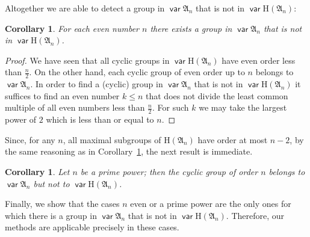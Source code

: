 \documentclass[preprint,1p,times]{elsarticle}
\DeclareMathOperator{\var}{\mathsf{var}}
\numberwithin{equation}{section}
\newtheorem{Cor}[Thm]{Corollary}
\theoremstyle{remark}
\def\H{\mathrm H}
\def\A{\mathfrak{A}}
\begin{document}
Altogether we are able to detect a group in $\var\A_n$ that is not in $\var\H(\A_n)$:

\begin{Cor}
\label{differenceofanandhan} For each even number $n$ there exists a group in $\var\A_n$ that is not in $\var\H(\A_n)$.
\end{Cor}

\begin{proof} We have seen that all cyclic groups in $\var\H(\A_n)$
have even order less than $\frac n2$. On the other hand, each cyclic group of even order up to $n$ belongs to
$\var\A_n$. In order to find a (cyclic) group in $\var\A_n$ that is not in $\var\H(\A_n)$ it suffices to find an even
number $k\le n$ that does not divide the least common multiple of all even numbers less than $\frac n 2$. For such $k$
we may take the largest power of $2$ which is less than or equal to $n$.
\end{proof}

Since, for any $n$, all maximal subgroups of $\H(\A_n)$ have order at most $n-2$, by the same reasoning as in
Corollary~\ref{differenceofanandhan}, the next result is immediate.

\begin{Cor}
\label{differenceofanandhanodd} Let $n$ be a prime power; then the cyclic group of order $n$ belongs to $\var\A_n$ but
not to $\var\H(\A_n)$.
\end{Cor}

Finally, we show that the cases $n$ even or a prime power are the only ones for which there is a group in $\var\A_n$
that is not in $\var\H(\A_n)$. Therefore, our methods are applicable precisely in these cases.
\end{document}
